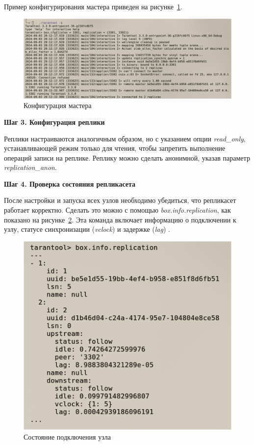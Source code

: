 Пример конфигурирования мастера приведен на рисунке~\ref{fig:fig01}.

\begin{figure}
  \centering
  \includegraphics[scale=0.35]{inc/master.png}
  \caption{Конфигурация мастера}
  \label{fig:fig01}
\end{figure}

\textbf{Шаг 3. Конфигурация реплики}

Реплики настраиваются аналогичным образом, но с указанием опции \textit{read\_only}, устанавливающей режим только для чтения, чтобы запретить выполнение операций записи на реплике. Реплику можно сделать анонимной, указав параметр \textit{replication\_anon}.

\textbf{Шаг 4. Проверка состояния репликасета}

После настройки и запуска всех узлов необходимо убедиться, что репликасет работает корректно. Сделать это можно с помощью \textit{box.info.replication}, как показано на рисунке~\ref{fig:fig03}. Эта команда включает информацию о подключении к узлу, статусе синхронизации (\textit{vclock}) и задержке (\textit{lag}) \cite{TarantoolDoc}.

\begin{figure}
  \centering
  \includegraphics[scale=0.35]{inc/master-info.png}
  \caption{Состояние подключения узла}
  \label{fig:fig03}
\end{figure}


